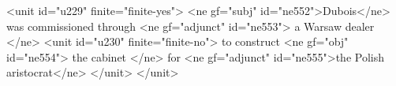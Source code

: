 <unit id="u229" finite="finite-yes">
    <ne gf="subj" id="ne552">Dubois</ne> was commissioned through
    <ne gf="adjunct" id="ne553"> a Warsaw dealer </ne>
    <unit id="u230" finite="finite-no"> to construct
        <ne gf="obj" id="ne554"> the cabinet </ne> for
        <ne gf="adjunct" id="ne555">the Polish aristocrat</ne>
    </unit>
</unit>